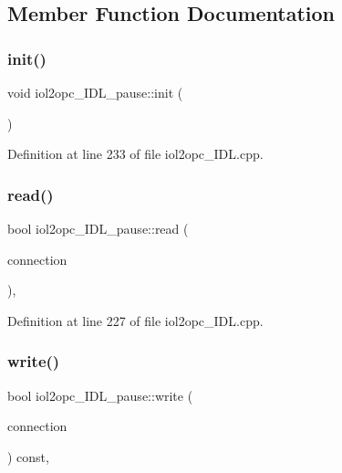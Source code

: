 \subsection{Member Function Documentation}
\mbox{\label{classiol2opc__IDL__pause_a5d62b34689c2bb826756479dfe8b382a}} 
\subsubsection{\texorpdfstring{init()}{init()}}
{\footnotesize\ttfamily void iol2opc\+\_\+\+I\+D\+L\+\_\+pause\+::init (\begin{DoxyParamCaption}{ }\end{DoxyParamCaption})}



Definition at line 233 of file iol2opc\+\_\+\+I\+D\+L.\+cpp.

\mbox{\label{classiol2opc__IDL__pause_a3cec64bee9a39ae47f9da8e85aaa36c6}} 
\subsubsection{\texorpdfstring{read()}{read()}}
{\footnotesize\ttfamily bool iol2opc\+\_\+\+I\+D\+L\+\_\+pause\+::read (\begin{DoxyParamCaption}\item[{yarp\+::os\+::\+Connection\+Reader \&}]{connection }\end{DoxyParamCaption})\hspace{0.3cm}{\ttfamily [override]}, {\ttfamily [virtual]}}



Definition at line 227 of file iol2opc\+\_\+\+I\+D\+L.\+cpp.

\mbox{\label{classiol2opc__IDL__pause_a573548bb7abe548ebb7b2e07ddc27291}} 
\subsubsection{\texorpdfstring{write()}{write()}}
{\footnotesize\ttfamily bool iol2opc\+\_\+\+I\+D\+L\+\_\+pause\+::write (\begin{DoxyParamCaption}\item[{yarp\+::os\+::\+Connection\+Writer \&}]{connection }\end{DoxyParamCaption}) const\hspace{0.3cm}{\ttfamily [override]}, {\ttfamily [virtual]}}



